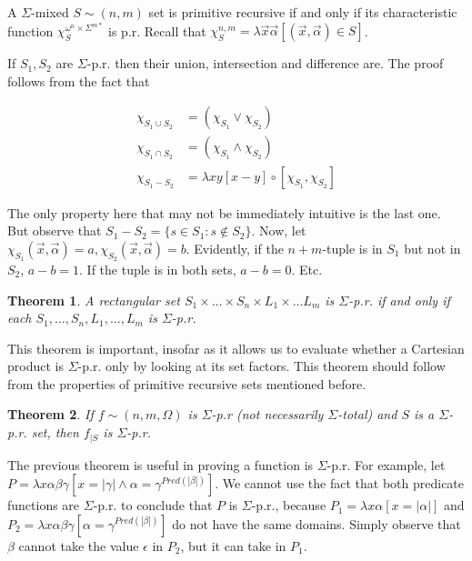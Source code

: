 \documentclass[a4paper, 12pt]{article}
\newtheorem{theorem}{Theorem}
\newtheorem{theorem}{Theorem}
\begin{document}
A $\Sigma$-mixed $S \sim (n, m)$ set is primitive recursive if and only if its
characteristic function $\chi_S^{\omega^n \times \Sigma^{m*}}$ is p.r. Recall
that $\chi_S^{n, m} = \lambda
\overrightarrow{x}\overrightarrow{\alpha}[(\overrightarrow{x},
\overrightarrow{\alpha}) \in S]$.

If $S_1, S_2$ are $\Sigma$-p.r. then their union, intersection and difference
are. The proof follows from the fact that 

\begin{align*}
    \chi_{S_1 \cup S_2} &= \left( \chi_{S_1} \lor \chi_{S_2} \right) \\ 
    \chi_{S_1 \cap S_2} &= \left( \chi_{S_1} \land \chi_{S_2} \right) \\ 
    \chi_{S_1 - S_2} &= \lambda xy[x - y] \circ \left[ \chi_{S_1}, \chi_{S_2} \right] 
\end{align*}

The only property here that may not be immediately intuitive is the last one.
But observe that $S_1 - S_2 = \{s \in S_1 : s \not\in S_2\}$. Now, let
$\chi_{S_1}(\overrightarrow{x}, \overrightarrow{\alpha}) = a,
\chi_{S_2}(\overrightarrow{x}, \overrightarrow{\alpha}) = b$. Evidently, if the
$n+m$-tuple is in $S_1$ but not in $S_2$, $a - b = 1$. If the tuple is in both
sets, $a - b = 0$. Etc.

\begin{theorem}
    A rectangular set $S_1 \times  \ldots \times  S_n \times  L_1 \times  \ldots
    L_m$ is $\Sigma$-p.r. if and only if each $S_1, \ldots, S_n, L_1, \ldots,
    L_m$ is $\Sigma$-p.r.
\end{theorem}

This theorem is important, insofar as it allows us to evaluate whether a
Cartesian product is $\Sigma$-p.r. only by looking at its set factors. This
theorem should follow from the properties of primitive recursive sets mentioned
before.

\begin{theorem}
    If $f \sim (n, m, \Omega)$ is $\Sigma$-p.r (not necessarily $\Sigma$-total) and $S$ is a $\Sigma$-p.r. set,
    then $f_{\mid S}$ is $\Sigma$-p.r. 
\end{theorem}

The previous theorem is useful in proving a function is $\Sigma$-p.r. For
example, let $P = \lambda x\alpha\beta \gamma \left[  x = |\gamma| \land \alpha
= \gamma^{Pred(|\beta|)}\right] $. We cannot use the fact that both predicate
functions are $\Sigma$-p.r. to conclude that $P$ is $\Sigma$-p.r., because $P_1
= \lambda x\alpha [x = |\alpha|]$ and $P_2 = \lambda x \alpha \beta \gamma
[\alpha =
\gamma^{Pred(|\beta|)}]$ do not have the same domains. Simply observe that
$\beta$ cannot take the value $\epsilon$ in $P_2$, but it can take in $P_1$.
\end{document}

